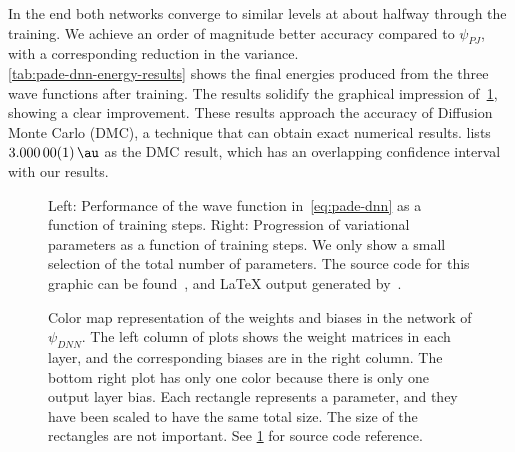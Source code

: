 \documentclass[Thesis.tex]{subfiles}
\begin{document}
In the end both networks converge to similar levels at about halfway through the
training. We achieve an order of magnitude better accuracy compared to $\psi_{PJ}$, with a corresponding
reduction in the variance.\\

\cref{tab:pade-dnn-energy-results} shows the final energies produced from the
three wave functions after training. The results solidify the graphical impression
of~\cref{fig:QD-pade-dnn-training}, showing a clear improvement. These results
approach the accuracy of Diffusion Monte Carlo (DMC), a technique that can obtain
exact numerical results. \textcite{Pedersen-2011} lists $\SI{3.00000(1)}{\au}$
as the DMC result, which has an overlapping confidence interval with our results.

\begin{figure}[h]
   \centering
    \resizebox{\linewidth}{!}{%
        
    }
    \caption{\label{fig:QD-pade-dnn-training}Left: Performance of the wave
function in~\cref{eq:pade-dnn} as a function of training steps. Right:
Progression of variational parameters as a function of training steps. We only
show a small selection of the total number of parameters. The source code for this graphic
can be found~\cite[TODO: Add path]{MS-thesis-repository}, and \LaTeX{} output
generated by~\cite{nico_schlomer_2018_1173090}.}
\end{figure}

\begin{table}[h]
  \centering
  \label{tab:pade-dnn-energy-results}
  \caption{Energy using the neural network wave function in~\cref{eq:pade-dnn}, along with
the benchmark wave function after the same amount of optimization. Results obtained
from $2^{22}$ Monte Carlo samples and errors estimated by an automated blocking
algorithm by~\textcite{Jonsson-2018}. See
\cref{fig:QD-pade-dnn-training} for source code reference.}
  
\end{table}

%         

\begin{figure}[h]
   \centering
    \resizebox{\linewidth}{!}{%
        
    }
    \caption{\label{fig:QD-pade-dnn-weights}Color map representation of the
weights and biases in the network of $\psi_{DNN}$. The left column of plots
shows the weight matrices in each layer, and the corresponding biases are in the
right column. The bottom right plot has only one color because there is only one
output layer bias. Each rectangle represents a parameter, and they have been
scaled to have the same total size. The size of the rectangles are not
important. See \cref{fig:QD-pade-dnn-training} for source code reference.}
\end{figure}
\end{document}
